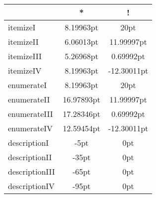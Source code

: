 ﻿\documentclass{article}
\begin{document}
    \begin{tabular}{lcc}
        \toprule
        &*&!\\
        \midrule
        \rowcolor{gray!30}
        itemizeI&8.19963pt&20pt\\
        \rowcolor{gray!30}
        itemizeII&6.06013pt&11.99997pt\\
        itemizeIII&5.26968pt&0.69992pt\\
        itemizeIV&8.19963pt&-12.30011pt\\
        \midrule
        \rowcolor{gray!30}
        enumerateI&8.19963pt&20pt\\
        enumerateII&16.97893pt&11.99997pt\\
        enumerateIII&17.28346pt&0.69992pt\\
        enumerateIV&12.59454pt&-12.30011pt\\
        \midrule
        descriptionI&-5pt&0pt\\
        descriptionII&-35pt&0pt\\
        descriptionIII&-65pt&0pt\\
        descriptionIV&-95pt&0pt\\
        \bottomrule
    \end{tabular}

\hrulefill
\end{document}
